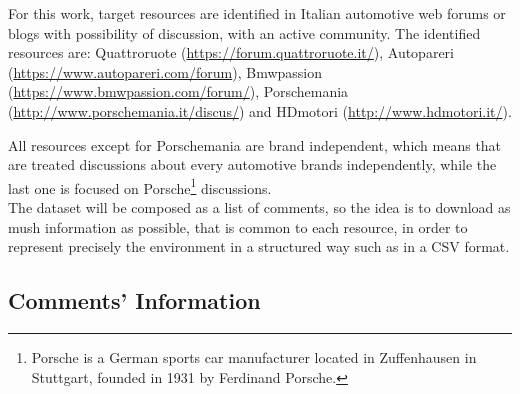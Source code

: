 For this work, target resources are identified in Italian automotive web forums or blogs with possibility of discussion, with an active community. The identified resources are: Quattroruote (\url{https://forum.quattroruote.it/}), Autopareri (\url{https://www.autopareri.com/forum}), Bmwpassion (\url{https://www.bmwpassion.com/forum/}), Porschemania (\url{http://www.porschemania.it/discus/}) and HDmotori (\url{http://www.hdmotori.it/}). 





All resources except for Porschemania are brand independent, which means that are treated discussions about every automotive brands independently, while the last one is focused on Porsche\footnote{Porsche is a German sports car manufacturer located in Zuffenhausen in Stuttgart, founded in 1931 by Ferdinand Porsche.} discussions.\\
The dataset will be composed as a list of comments, so the idea is to download as mush information as possible, that is common to each resource, in order to represent precisely the environment in a structured way such as in a \ac{CSV} format.

\subsection{Comments' Information}

